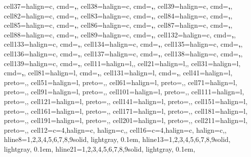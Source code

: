 \documentclass[
  11pt,
  oneside]{article}
\begin{document}
\begin{table}
{{\begin{talltblr}
{cell{3}{7}={}{halign=c, cmd=\bfseries,},
cell{3}{8}={}{halign=c, cmd=\bfseries,},
cell{3}{9}={}{halign=c, cmd=\bfseries,},
cell{8}{2}={}{halign=c, cmd=\bfseries,},
cell{8}{3}={}{halign=c, cmd=\bfseries,},
cell{8}{4}={}{halign=c, cmd=\bfseries,},
cell{8}{5}={}{halign=c, cmd=\bfseries,},
cell{8}{6}={}{halign=c, cmd=\bfseries,},
cell{8}{7}={}{halign=c, cmd=\bfseries,},
cell{8}{8}={}{halign=c, cmd=\bfseries,},
cell{8}{9}={}{halign=c, cmd=\bfseries,},
cell{13}{2}={}{halign=c, cmd=\bfseries,},
cell{13}{3}={}{halign=c, cmd=\bfseries,},
cell{13}{4}={}{halign=c, cmd=\bfseries,},
cell{13}{5}={}{halign=c, cmd=\bfseries,},
cell{13}{6}={}{halign=c, cmd=\bfseries,},
cell{13}{7}={}{halign=c, cmd=\bfseries,},
cell{13}{8}={}{halign=c, cmd=\bfseries,},
cell{13}{9}={}{halign=c, cmd=\bfseries,},
cell{1}{1}={}{halign=l,},
cell{2}{1}={}{halign=l,},
cell{3}{1}={}{halign=l, cmd=\bfseries,},
cell{8}{1}={}{halign=l, cmd=\bfseries,},
cell{13}{1}={}{halign=l, cmd=\bfseries,},
cell{4}{1}={}{halign=l, preto={\hspace{1em}},},
cell{5}{1}={}{halign=l, preto={\hspace{1em}},},
cell{6}{1}={}{halign=l, preto={\hspace{1em}},},
cell{7}{1}={}{halign=l, preto={\hspace{1em}},},
cell{9}{1}={}{halign=l, preto={\hspace{1em}},},
cell{10}{1}={}{halign=l, preto={\hspace{1em}},},
cell{11}{1}={}{halign=l, preto={\hspace{1em}},},
cell{12}{1}={}{halign=l, preto={\hspace{1em}},},
cell{14}{1}={}{halign=l, preto={\hspace{1em}},},
cell{15}{1}={}{halign=l, preto={\hspace{1em}},},
cell{16}{1}={}{halign=l, preto={\hspace{1em}},},
cell{17}{1}={}{halign=l, preto={\hspace{1em}},},
cell{18}{1}={}{halign=l, preto={\hspace{1em}},},
cell{19}{1}={}{halign=l, preto={\hspace{1em}},},
cell{20}{1}={}{halign=l, preto={\hspace{1em}},},
cell{21}{1}={}{halign=l, preto={\hspace{1em}},},
cell{1}{2}={c=4,}{halign=c, halign=c,},
cell{1}{6}={c=4,}{halign=c, halign=c,},
hline{8}={1,2,3,4,5,6,7,8,9}{solid, lightgray, 0.1em},
hline{13}={1,2,3,4,5,6,7,8,9}{solid, lightgray, 0.1em},
hline{21}={1,2,3,4,5,6,7,8,9}{solid, lightgray, 0.1em},
}
\end{talltblr}}}
\end{table}
\end{document}

